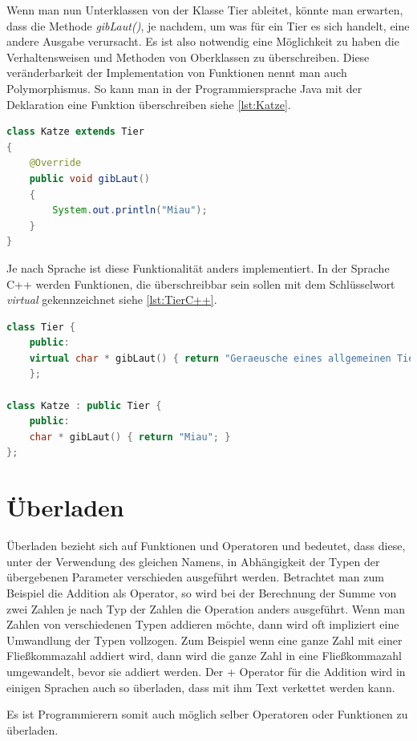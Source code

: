 \documentclass[
	12pt, %
	a4paper,
	listof=totoc, %
	bibliography=totoc, %
	numbers=noenddot, %
	ngerman, %
	headsepline, %
	oneside %
	]{scrbook} %
\begin{document}
Wenn man nun Unterklassen von der Klasse Tier ableitet, könnte man erwarten, dass die Methode \emph{gibLaut()}, je nachdem, um was für ein Tier es sich handelt, eine andere Ausgabe verursacht.  
Es ist also notwendig eine Möglichkeit zu haben die Verhaltensweisen und Methoden von Oberklassen zu überschreiben. Diese veränderbarkeit der Implementation von Funktionen nennt man auch Polymorphismus. 
So kann man in der Programmiersprache Java mit der Deklaration \emph{\@Override} eine Funktion überschreiben siehe \ref{lst:Katze}.

\begin{lstlisting}[language=Java, caption=Klasse Katze, label={lst:Katze}]
class Katze extends Tier
{
    @Override
    public void gibLaut()
    {
        System.out.println("Miau");
    }
}
\end{lstlisting}

Je nach Sprache ist diese Funktionalität anders implementiert. In der Sprache C++ werden Funktionen, die überschreibbar sein sollen mit dem Schlüsselwort \emph{virtual} gekennzeichnet siehe \ref{lst:TierC++}.

\begin{lstlisting}[language=C++, caption=Tier und Katzen Beispiel in C++, label={lst:TierC++}]
class Tier {
	public:
	virtual char * gibLaut() { return "Geraeusche eines allgemeinen Tiers"; }
	};
	
class Katze : public Tier {
	public:
	char * gibLaut() { return "Miau"; }
};
\end{lstlisting}

\section{Überladen}
Überladen bezieht sich auf Funktionen und Operatoren und bedeutet, dass diese, unter der Verwendung des gleichen Namens, in Abhängigkeit der Typen der übergebenen Parameter verschieden ausgeführt werden. Betrachtet man zum Beispiel die Addition als Operator, so wird bei der Berechnung der Summe von zwei Zahlen je nach Typ der Zahlen die Operation anders ausgeführt.  
Wenn man Zahlen von verschiedenen Typen addieren möchte, dann wird oft impliziert eine Umwandlung der Typen vollzogen. Zum Beispiel wenn eine ganze Zahl mit einer Fließkommazahl addiert wird, dann wird die ganze Zahl in eine Fließkommazahl umgewandelt, bevor sie addiert werden.  
Der + Operator für die Addition wird in einigen Sprachen auch so überladen, dass mit ihm Text verkettet werden kann.  
  
Es ist Programmierern somit auch möglich selber Operatoren oder Funktionen zu überladen.
\end{document}
